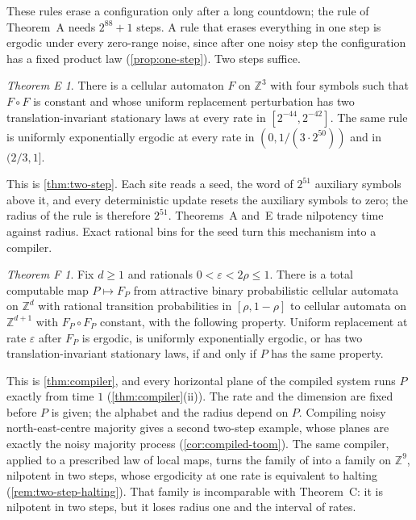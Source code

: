 \documentclass[11pt]{article}
\theoremstyle{plain}
\theoremstyle{definition}
\theoremstyle{remark}
\newtheorem*{mainE}{Theorem E}
\newtheorem*{mainF}{Theorem F}
\newcommand{\Z}{\mathbb Z}
\newcommand{\eps}{\varepsilon}
\begin{document}
These rules erase a configuration only after a long countdown; the rule of Theorem~A needs $2^{88}+1$ steps. A rule that erases everything in one step is ergodic under every zero-range noise, since after one noisy step the configuration has a fixed product law (\cref{prop:one-step}). Two steps suffice.
\begin{mainE}
There is a cellular automaton $F$ on $\Z^3$ with four symbols such that $F\circ F$ is constant and whose uniform replacement perturbation has two translation-invariant stationary laws at every rate in $[2^{-44},2^{-42}]$. The same rule is uniformly exponentially ergodic at every rate in $(0,1/(3\cdot2^{50}))$ and in $(2/3,1]$.
\end{mainE}
This is \cref{thm:two-step}. Each site reads a seed, the word of $2^{51}$ auxiliary symbols above it, and every deterministic update resets the auxiliary symbols to zero; the radius of the rule is therefore $2^{51}$. Theorems~A and~E trade nilpotency time against radius. Exact rational bins for the seed turn this mechanism into a compiler.
\begin{mainF}
Fix $d\geq1$ and rationals $0<\eps<2\rho\leq1$. There is a total computable map $P\mapsto F_P$ from attractive binary probabilistic cellular automata on $\Z^d$ with rational transition probabilities in $[\rho,1-\rho]$ to cellular automata on $\Z^{d+1}$ with $F_P\circ F_P$ constant, with the following property. Uniform replacement at rate $\eps$ after $F_P$ is ergodic, is uniformly exponentially ergodic, or has two translation-invariant stationary laws, if and only if $P$ has the same property.
\end{mainF}
This is \cref{thm:compiler}, and every horizontal plane of the compiled system runs $P$ exactly from time $1$ (\cref{thm:compiler}(ii)). The rate and the dimension are fixed before $P$ is given; the alphabet and the radius depend on $P$. Compiling noisy north-east-centre majority gives a second two-step example, whose planes are exactly the noisy majority process (\cref{cor:compiled-toom}). The same compiler, applied to a prescribed law of local maps, turns the family of \cite{DM26A} into a family on $\Z^9$, nilpotent in two steps, whose ergodicity at one rate is equivalent to halting (\cref{rem:two-step-halting}). That family is incomparable with Theorem~C: it is nilpotent in two steps, but it loses radius one and the interval of rates.
\end{document}
